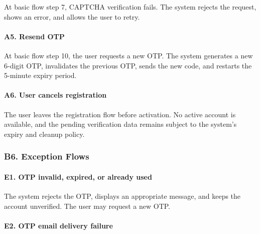 \documentclass[12pt]{article}
\begin{document}
At basic flow step 7, CAPTCHA verification fails. The system rejects the request, shows an error, and allows the user to retry.
\par\medskip

\hypertarget{sec:a5-resend-otp}{}
\paragraph*{A5. Resend OTP}
\par\medskip

At basic flow step 10, the user requests a new OTP. The system generates a new 6-digit OTP, invalidates the previous OTP, sends the new code, and restarts the 5-minute expiry period.
\par\medskip

\hypertarget{sec:a6-user-cancels-registration}{}
\paragraph*{A6. User cancels registration}
\par\medskip

The user leaves the registration flow before activation. No active account is available, and the pending verification data remains subject to the system's expiry and cleanup policy.
\par\medskip

\hypertarget{sec:b6-exception-flows}{}
\subsubsection*{B6. Exception Flows}
\par\medskip

\hypertarget{sec:e1-otp-invalid-expired-or-already-used}{}
\paragraph*{E1. OTP invalid, expired, or already used}
\par\medskip

The system rejects the OTP, displays an appropriate message, and keeps the account unverified. The user may request a new OTP.
\par\medskip

\hypertarget{sec:e2-otp-email-delivery-failure}{}
\paragraph*{E2. OTP email delivery failure}
\par\medskip
\end{document}
